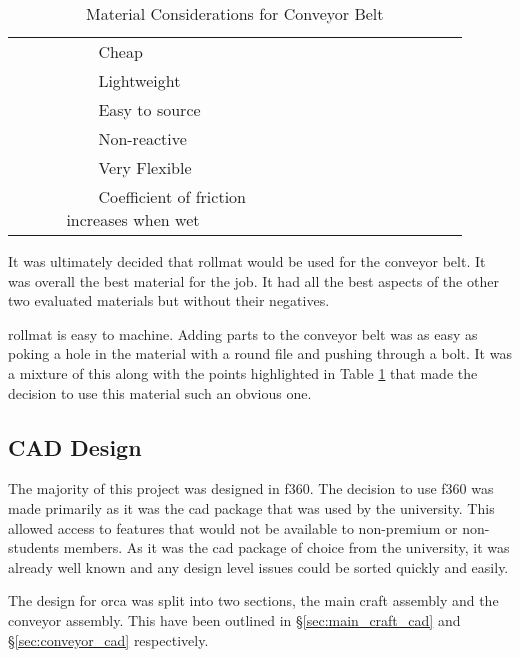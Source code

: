\documentclass [12pt]{article}
\newcommand{\tabitem}{~~\llap{\textbullet}~~}
\begin{document}
\begin{table}[H]
\begin{tabular}{|p{0.1\linewidth}|p{0.4\linewidth}|p{0.4\linewidth}|}
\cellcolor{gray!20}  & \cellcolor{gray!20} \tabitem Cheap & \cellcolor{gray!20} \\
\cellcolor{gray!20}  & \cellcolor{gray!20} \tabitem Lightweight & \cellcolor{gray!20} \\
\cellcolor{gray!20}  & \cellcolor{gray!20} \tabitem Easy to source & \cellcolor{gray!20} \\
\cellcolor{gray!20}  & \cellcolor{gray!20} \tabitem Non-reactive & \cellcolor{gray!20} \\
\cellcolor{gray!20}  & \cellcolor{gray!20} \tabitem Very Flexible & \cellcolor{gray!20} \\
\cellcolor{gray!20}  & \cellcolor{gray!20} \tabitem Coefficient of friction increases when wet & \cellcolor{gray!20} \\
\hline
\end{tabular}
\caption{Material Considerations for Conveyor Belt}
\label{table:conveyor_materials}
\end{table} 

It was ultimately decided that \gls{rollmat} \cite{Plastazote} would be used for the conveyor belt. It was overall the best material for the job. It had all the best aspects of the other two evaluated materials but without their negatives. 

\Gls{rollmat} is easy to machine. Adding parts to the conveyor belt was as easy as poking a hole in the material with a round file and pushing through a bolt. It was a mixture of this along with the points highlighted in Table \ref{table:conveyor_materials} that made the decision to use this material such an obvious one. 


\subsection{CAD Design}

The majority of this project was designed in \gls{f360}. The decision to use \gls{f360} was made primarily as it was the \gls{cad} package that was used by the university. This allowed access to features that would not be available to non-premium or non-students members. As it was the \gls{cad} package of choice from the university, it was already well known and any design level issues could be sorted quickly and easily. 

The design for \gls{orca} was split into two sections, the main craft assembly and the conveyor assembly. This have been outlined in §\ref{sec:main_craft_cad} and §\ref{sec:conveyor_cad} respectively.
\end{document}
